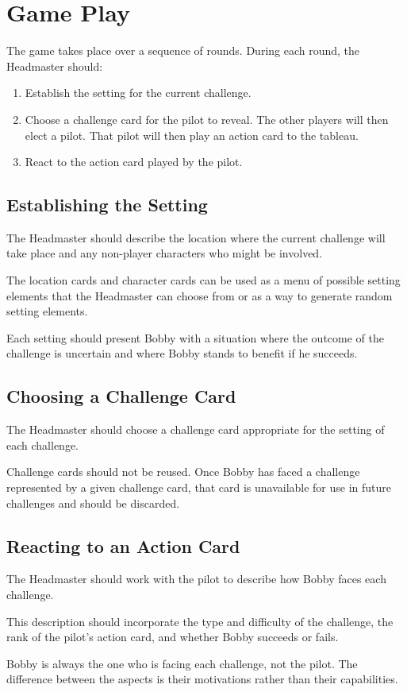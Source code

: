 \section{Game Play}
The game takes place over a sequence of rounds. During each round, the Headmaster should:
\begin{enumerate}
	\item Establish the setting for the current challenge. 
	\item Choose a challenge card for the pilot to reveal. The  other players will then elect a pilot. That pilot will then play an action card to the tableau.
	\item React to the action card played by the pilot.
\end{enumerate}

\subsection{Establishing the Setting}
The Headmaster should describe the location where the current challenge will take place and any non-player characters who might be involved.

The location cards and character cards can be used as a menu of possible setting elements that the Headmaster can choose from or as a way to generate random setting elements.

Each setting should present Bobby with a situation where the outcome  of the challenge is uncertain and where Bobby stands to benefit if he succeeds. 


\subsection{Choosing a Challenge Card}
The Headmaster should choose a challenge card appropriate for the setting of each challenge.

Challenge cards should not be reused.  Once Bobby has faced a challenge represented by a given challenge card, that card is unavailable for use in future challenges and should be discarded.
  

\subsection{Reacting to an Action Card}
The Headmaster should work with the pilot to describe how Bobby faces each challenge.

This description should incorporate the type and difficulty of the challenge, the rank of the pilot's action card, and whether Bobby succeeds or fails.

Bobby is always the one who is facing each challenge, not the pilot. The difference between the aspects is their motivations rather than their capabilities.

